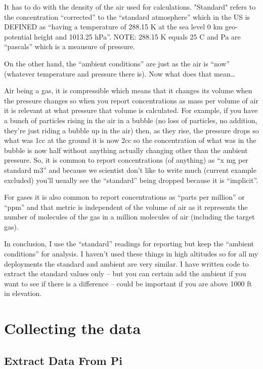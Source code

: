 \documentclass{article}\usepackage[]{graphicx}\usepackage[]{color}
\begin{document}
It has to do with the density of the air used for calculations. "Standard" refers to the concentration ``corrected'' to the ``standard atmosphere'' which in the US is DEFINED as ``having a temperature of 288.15 K at the sea level 0 km geo-potential height and 1013.25 hPa''. NOTE: 288.15 K equals 25 C and Pa are ``pascals'' which is a meausure of pressure. 

On the other hand, the ``ambient conditions'' are just as the air is ``now'' (whatever temperature and pressure there is). Now what does that mean\ldots

Air being a gas, it is compressible which means that it changes its volume when the pressure changes so when you report concentrations as mass per volume of air it is relevant at what pressure that volume is calculated. For example, if you have a bunch of particles rising in the air in a bubble (no loss of particles, no addition, they're just riding a bubble up in the air) then, as they rise, the pressure drops so what was 1cc at the ground it is now 2cc so the concentration of what was in the bubble is now half without anything actually changing other than the ambient pressure. So, it is common to report concentrations (of anything) as ``x mg per standard m3'' and because we scientist don't like to write much (current example excluded) you'll usually see the ``standard'' being dropped because it is ``implicit''.

For gases it is also common to report concentrations as ``parts per million'' or ``ppm'' and that metric is independent of the volume of air as it represents the number of molecules of the gas in a million molecules of air (including the target gas).

In conclusion, I use the ``standard'' readings for reporting but keep the ``ambient conditions'' for analysis. I haven't used these things in high altitudes so for all my deployments the standard and ambient are very similar. I have written code to extract the standard values only -- but you can certain add the ambient if you want to see if there is a difference -- could be important if you are above 1000 ft in elevation.

\section{Collecting the data}

\subsection{Extract Data From Pi}
\end{document}
